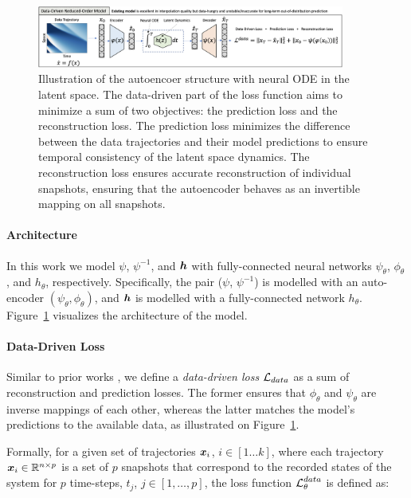 \begin{figure}
    \centering
    \includegraphics[width=0.9\textwidth]{figures/abstract_data_driven.png}
    \caption{Illustration of the autoencoer structure with neural ODE in the latent space. The data-driven part of the loss function aims to minimize a sum of two objectives: the prediction loss and the reconstruction loss. The prediction loss minimizes the difference between the data trajectories and their model predictions to ensure temporal consistency of the latent space dynamics. The reconstruction loss ensures accurate reconstruction of individual snapshots, ensuring that the autoencoder behaves as an invertible mapping on all snapshots.}
    \label{fig:data_driven_loss}
\end{figure}

\paragraph{Architecture} In this work we model $\psi$, $\psi^{-1}$, and $\boldsymbol{h}$ with fully-connected neural networks $\psi_\theta$, $\phi_\theta$, and $h_\theta$, respectively. Specifically, the pair ($\psi$, $\psi^{-1}$) is modelled with an auto-encoder $(\psi_\theta, \phi_\theta)$, and $\boldsymbol{h}$ is modelled with a fully-connected network $h_\theta$. Figure~\ref{fig:data_driven_loss} visualizes the architecture of the model.

\paragraph{Data-Driven Loss} Similar to prior works \cite{takeishi2017learning,morton2019deep,gin2021deep}, we define a \textit{data-driven loss} $\operatorname{\mathcal{L}}_{data}$ as a sum of reconstruction and prediction losses. The former ensures that $\phi_\theta$ and $\psi_\theta$ are inverse mappings of each other, whereas the latter matches the model's predictions to the available data, as illustrated on Figure~\ref{fig:data_driven_loss}.

 Formally, for a given set of trajectories $\boldsymbol{x}_i$, $i \in [1 \dots k]$, where each trajectory $\boldsymbol{x}_i \in \mathbb{R}^{n \times p}$ is a set of $p$ snapshots that correspond to the recorded states of the system for $p$ time-steps, $t_j$, $j \in [1, \dots, p]$, the loss function $\operatorname{\mathcal{L}}^{data}_\theta$ is defined as:

